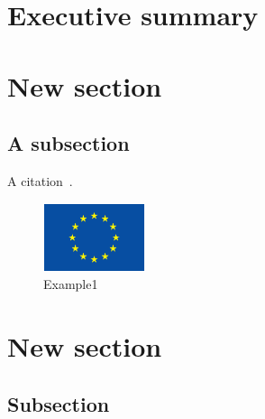 \documentclass[a4paper,11pt]{article}
\numberwithin{table}{subsection} %
\begin{document}

\clearpage\setcounter{page}{1}\pagestyle{HeadAndFootPageTOC}

\tableofcontents %
%





\clearpage\setcounter{page}{1}\pagestyle{HeadAndFootPage}

\section{Executive summary}

\newpage

\section{New section}

\subsection{A subsection}

A citation~\cite{open_data_h2020}.

\begin{figure}[ht]
\centering
\includegraphics[width=3cm]{figures/eu_flag_eps.eps}
\caption{Example1}
\label{fig:example1}
\end{figure}


\newpage

\section{New section}

\subsection{Subsection}
\end{document}
